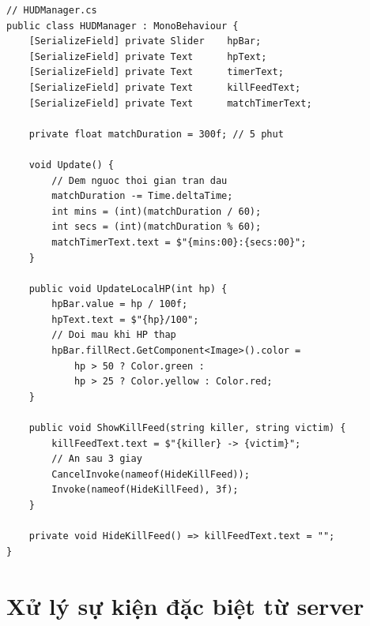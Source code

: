 \documentclass[12pt,a4paper]{report}
\begin{document}
\begin{lstlisting}[style=bashStyle, caption={HUDManager --- cập nhật UI theo trạng thái game}, label={lst:hud}]
// HUDManager.cs
public class HUDManager : MonoBehaviour {
    [SerializeField] private Slider    hpBar;
    [SerializeField] private Text      hpText;
    [SerializeField] private Text      timerText;
    [SerializeField] private Text      killFeedText;
    [SerializeField] private Text      matchTimerText;

    private float matchDuration = 300f; // 5 phut

    void Update() {
        // Dem nguoc thoi gian tran dau
        matchDuration -= Time.deltaTime;
        int mins = (int)(matchDuration / 60);
        int secs = (int)(matchDuration % 60);
        matchTimerText.text = $"{mins:00}:{secs:00}";
    }

    public void UpdateLocalHP(int hp) {
        hpBar.value = hp / 100f;
        hpText.text = $"{hp}/100";
        // Doi mau khi HP thap
        hpBar.fillRect.GetComponent<Image>().color =
            hp > 50 ? Color.green :
            hp > 25 ? Color.yellow : Color.red;
    }

    public void ShowKillFeed(string killer, string victim) {
        killFeedText.text = $"{killer} -> {victim}";
        // An sau 3 giay
        CancelInvoke(nameof(HideKillFeed));
        Invoke(nameof(HideKillFeed), 3f);
    }

    private void HideKillFeed() => killFeedText.text = "";
}
\end{lstlisting}

\section{Xử lý sự kiện đặc biệt từ server}
\end{document}
